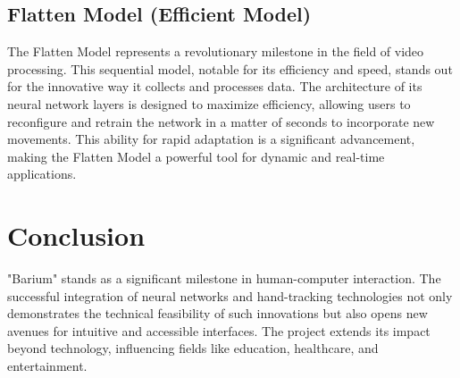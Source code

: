 \documentclass{article}
\begin{document}
\subsection{Flatten Model (Efficient Model)}
The Flatten Model represents a revolutionary milestone in the field of video processing. This sequential model, notable for its efficiency and speed, stands out for the innovative way it collects and processes data. The architecture of its neural network layers is designed to maximize efficiency, allowing users to reconfigure and retrain the network in a matter of seconds to incorporate new movements. This ability for rapid adaptation is a significant advancement, making the Flatten Model a powerful tool for dynamic and real-time applications.


\section{Conclusion}
"Barium" stands as a significant milestone in human-computer interaction. The successful integration of neural networks and hand-tracking technologies not only demonstrates the technical feasibility of such innovations but also opens new avenues for intuitive and accessible interfaces. The project extends its impact beyond technology, influencing fields like education, healthcare, and entertainment.



\end{document}
